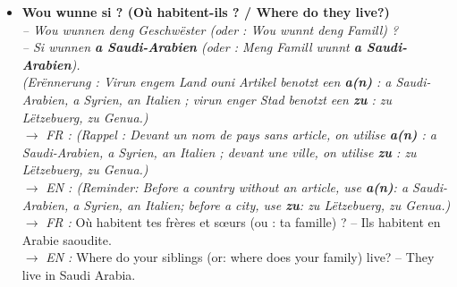 \begin{itemize}
    \item \textbf{Wou wunne si ? (Où habitent-ils ? / Where do they live?)} \\
    \textit{-- Wou wunnen deng Geschwëster (oder : Wou wunnt deng Famill) ?} \\
    \textit{-- Si wunnen \textbf{a Saudi-Arabien} (oder : Meng Famill wunnt \textbf{a Saudi-Arabien}).} \\
    \textit{(Erënnerung : Virun engem Land ouni Artikel benotzt een \textbf{a(n)} : \textit{a Saudi-Arabien}, \textit{a Syrien}, \textit{an Italien} ; virun enger Stad benotzt een \textbf{zu} : \textit{zu Lëtzebuerg}, \textit{zu Genua}.)} \\
    $\rightarrow$ \textit{FR : (Rappel : Devant un nom de pays sans article, on utilise \textbf{a(n)} : \textit{a Saudi-Arabien}, \textit{a Syrien}, \textit{an Italien} ; devant une ville, on utilise \textbf{zu} : \textit{zu Lëtzebuerg}, \textit{zu Genua}.)} \\
    $\rightarrow$ \textit{EN : (Reminder: Before a country without an article, use \textbf{a(n)}: \textit{a Saudi-Arabien}, \textit{a Syrien}, \textit{an Italien}; before a city, use \textbf{zu}: \textit{zu Lëtzebuerg}, \textit{zu Genua}.)} \\
    $\rightarrow$ \textit{FR :} Où habitent tes frères et sœurs (ou : ta famille) ? -- Ils habitent en Arabie saoudite. \\
    $\rightarrow$ \textit{EN :} Where do your siblings (or: where does your family) live? -- They live in Saudi Arabia.

    \vspace{0.3em}


\end{itemize}
